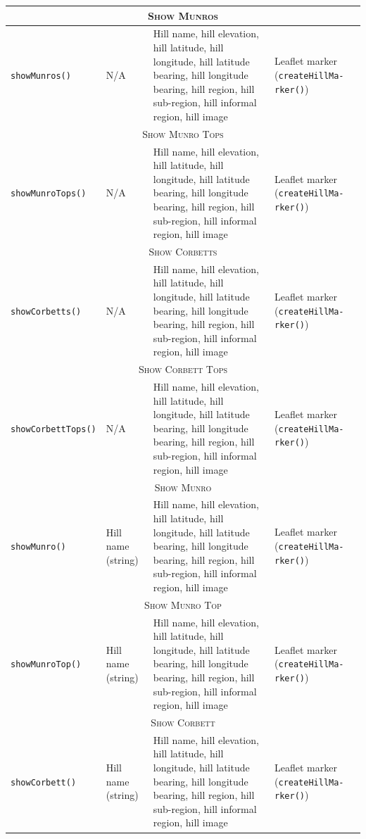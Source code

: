 \documentclass[11pt, english]{article}
\begin{document}
\begin{center}
\begin{longtable}{p{2.25cm}p{3.5cm}p{5cm}p{2cm}}
		\hline
		\multicolumn{4}{c}{\textsc{Show Munros}}\\
		\hline
		\texttt{showMunros()} & N/A & Hill name, hill elevation, hill latitude, hill longitude, hill latitude bearing, hill longitude bearing, hill region, hill sub-region, hill informal region, hill image & Leaflet marker (\texttt{createHillMa- rker()})\\
		\hline
		\multicolumn{4}{c}{\textsc{Show Munro Tops}}\\
		\hline
		\texttt{showMunroTops()} & N/A & Hill name, hill elevation, hill latitude, hill longitude, hill latitude bearing, hill longitude bearing, hill region, hill sub-region, hill informal region, hill image & Leaflet marker (\texttt{createHillMa- rker()})\\
		\hline
		\multicolumn{4}{c}{\textsc{Show Corbetts}}\\
		\hline
		\texttt{showCorbetts()} & N/A & Hill name, hill elevation, hill latitude, hill longitude, hill latitude bearing, hill longitude bearing, hill region, hill sub-region, hill informal region, hill image & Leaflet marker (\texttt{createHillMa- rker()})\\
		\hline
		\multicolumn{4}{c}{\textsc{Show Corbett Tops}}\\
		\hline
		\texttt{showCorbettTops()} & N/A & Hill name, hill elevation, hill latitude, hill longitude, hill latitude bearing, hill longitude bearing, hill region, hill sub-region, hill informal region, hill image & Leaflet marker (\texttt{createHillMa- rker()})\\
		\hline
		\multicolumn{4}{c}{\textsc{Show Munro}}\\
		\hline
		\texttt{showMunro()} & Hill name (string) & Hill name, hill elevation, hill latitude, hill longitude, hill latitude bearing, hill longitude bearing, hill region, hill sub-region, hill informal region, hill image & Leaflet marker (\texttt{createHillMa- rker()})\\
		\hline
		\multicolumn{4}{c}{\textsc{Show Munro Top}}\\
		\hline
		\texttt{showMunroTop()} & Hill name (string) & Hill name, hill elevation, hill latitude, hill longitude, hill latitude bearing, hill longitude bearing, hill region, hill sub-region, hill informal region, hill image & Leaflet marker (\texttt{createHillMa- rker()})\\
		\hline
		\multicolumn{4}{c}{\textsc{Show Corbett}}\\
		\hline
		\texttt{showCorbett()} & Hill name (string) & Hill name, hill elevation, hill latitude, hill longitude, hill latitude bearing, hill longitude bearing, hill region, hill sub-region, hill informal region, hill image & Leaflet marker (\texttt{createHillMa- rker()})\\

\end{longtable}
\end{center}
\end{document}
